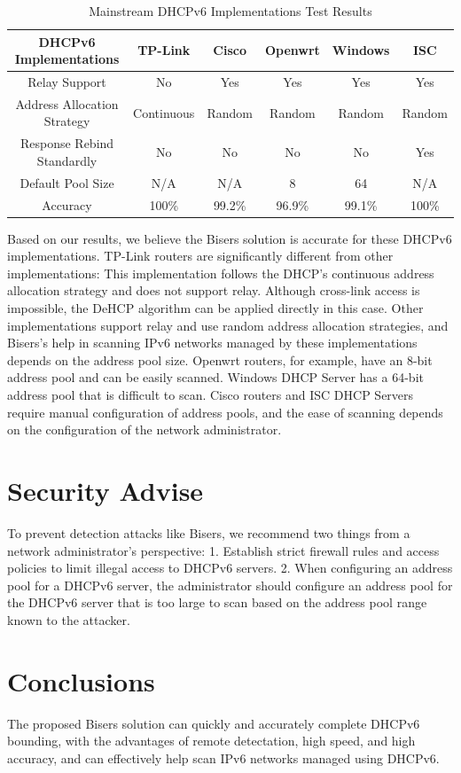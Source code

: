 \documentclass[conference]{IEEEtran}
\begin{document}
\begin{table}[htbp]
  \caption{Mainstream DHCPv6 Implementations Test Results}
  \label{tabDHCPv6Server}
  \centering
  \begin{tabular}{|c|c|c|c|c|c|}
    \hline
    DHCPv6 Implementations & TP-Link & Cisco & Openwrt & Windows & ISC \\
    \hline
    Relay Support & No & Yes & Yes & Yes & Yes \\
    Address Allocation Strategy & Continuous & Random & Random & Random & Random \\
    Response Rebind Standardly & No & No & No & No & Yes \\
    Default Pool Size & N/A & N/A & 8 & 64 & N/A \\
    Accuracy & 100\% & 99.2\% & 96.9\% & 99.1\% & 100\% \\
    \hline
  \end{tabular}
\end{table}

Based on our results, we believe the Bisers solution is accurate for
these DHCPv6 implementations. TP-Link routers are significantly
different from other implementations: This implementation follows the
DHCP's continuous address allocation strategy and does not support
relay. Although cross-link access is impossible, the DeHCP algorithm
can be applied directly in this case. Other implementations support
relay and use random address allocation strategies, and Bisers's help
in scanning IPv6 networks managed by these implementations depends on
the address pool size. Openwrt routers, for example, have an 8-bit
address pool and can be easily scanned. Windows DHCP Server has a
64-bit address pool that is difficult to scan. Cisco routers and ISC
DHCP Servers require manual configuration of address pools, and the
ease of scanning depends on the configuration of the network
administrator.

\section{Security Advise}

To prevent detection attacks like Bisers, we recommend two things from
a network administrator's perspective: 1. Establish strict firewall
rules and access policies to limit illegal access to DHCPv6
servers. 2. When configuring an address pool for a DHCPv6 server, the
administrator should configure an address pool for the DHCPv6 server
that is too large to scan based on the address pool range known to the
attacker.

\section{Conclusions}

The proposed Bisers solution can quickly and accurately complete
DHCPv6 bounding, with the advantages of remote detectation, high
speed, and high accuracy, and can effectively help scan IPv6 networks
managed using DHCPv6.



\end{document}
